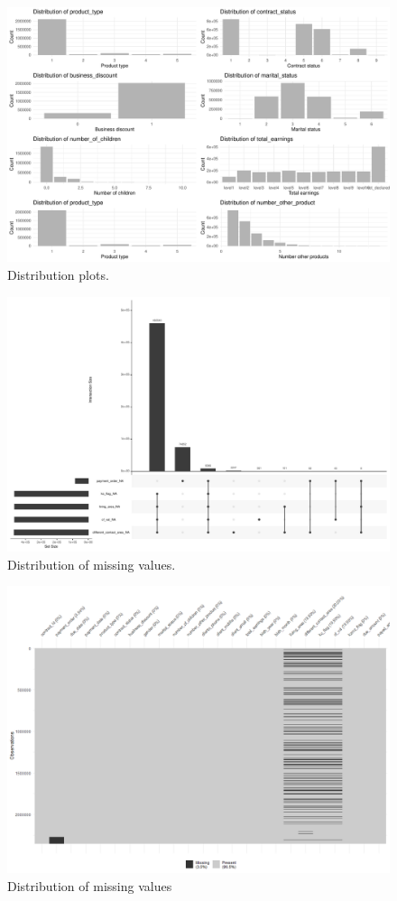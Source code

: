 \documentclass[
]{article}
\begin{document}
\begin{figure}
\centering
\includegraphics{Documentation_Rmarkdown_files/figure-latex/distribution-1.pdf}
\caption{\label{fig:distribution}Distribution plots.}
\end{figure}

\begin{figure}
\includegraphics[width=0.9\linewidth]{Documentation_Rmarkdown_files/figure-latex/Missing-complex-1} \caption{\label{fig:Missing-complex}Distribution of missing values.}\label{fig:Missing-complex}
\end{figure}

\begin{figure}
\includegraphics[width=0.9\linewidth]{missing_values_plot} \caption{\label{fig:missing-H}Distribution of missing values}\label{fig:missing-H}
\end{figure}
\end{document}
